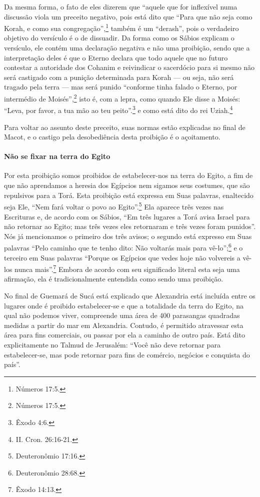 Da mesma forma, o fato de eles dizerem que ``aquele que for inflexível
numa discussão viola um preceito negativo, pois está dito que ``Para que
não seja como Korah, e como sua congregação'',\footnote{Números 17:5.} também é
um ``derash'', pois o verdadeiro objetivo do versículo é o de dissuadir.
Da forma como os Sábios explicam o versículo, ele contém uma declaração
negativa e não uma proibição, sendo que a interpretação deles é que o
Eterno declara que todo aquele que no futuro contestar a autoridade dos
Cohanim e reivindicar o sacerdócio para si mesmo não será castigado
com a punição determinada para Korah --- ou seja, não será tragado pela
terra --- mas será punido ``conforme tinha falado o Eterno, por
intermédio de Moisés'',\footnote{Números 17:5.} isto é, com a lepra, como quando
Ele disse a Moisés: ``Leva, por favor, a tua mão ao teu peito''.\footnote{Êxodo
4:6.} e como está dito do rei Uziah.\footnote{II. Cron. 26:16-21.}

Para voltar ao assunto deste preceito, suas normas estão explicadas no
final de Macot, e o castigo pela desobediência desta proibição é o
açoitamento.

\paragraph{Não se fixar na terra do Egito}

Por esta proibição somos proibidos de estabelecer-nos na terra do Egito,
a fim de que não aprendamos a heresia dos Egípcios nem sigamos seus
costumes, que são repulsivos para a Torá. Esta proibição está expressa
em Suas palavras, enaltecido seja Ele, ``Nem fará voltar o povo ao
Egito''.\footnote{Deuteronômio 17:16.} Ela aparece três vezes nas Escrituras e, de acordo com os
Sábios, ``Em três lugares a Torá avisa Israel para não retornar ao
Egito; mas três vezes eles retornaram e três vezes foram punidos''. Nós
já mencionamos o primeiro dos três avisos; o segundo está expresso em
Suas palavras ``Pelo caminho que te tenho dito: Não voltarás mais para
vê-lo'';\footnote{Deuteronômio 28:68.} e o terceiro em Suas palavras ``Porque os
Egípcios que vedes hoje não volvereis a vê-los nunca mais''.\footnote{Êxodo
14:13.} Embora de acordo com seu significado literal esta seja uma
afirmação, ela é tradicionalmente entendida como sendo uma proibição.

No final de Guemará de Sucá está explicado que Alexandria está incluída
entre os lugares onde é proibido estabelecer-se e que a totalidade da
terra do Egito, na qual não podemos viver, compreende uma área de 400
parasangas quadradas medidas a partir do mar em Alexandria. Contudo, é
permitido atravessar esta área para fins comerciais, ou passar por ela a
caminho de outro país. Está dito explicitamente no Talmud de Jerusalém:
``Você não deve retornar para estabelecer-se, mas pode retornar para
fins de comércio, negócios e conquista do país''.

